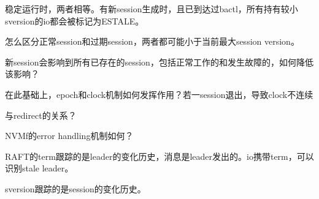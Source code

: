 稳定运行时，两者相等。有新session生成时，且已到达过bactl，所有持有较小sversion的io都会被标记为ESTALE。

怎么区分正常session和过期session，两者都可能小于当前最大session version。

新session会影响到所有已存在的session，包括正常工作的和发生故障的，如何降低该影响？

在此基础上，epoch和clock机制如何发挥作用？若一session退出，导致clock不连续

与redirect的关系？

NVMf的error handling机制如何？

\hrulefill


RAFT的term跟踪的是leader的变化历史，消息是leader发出的。io携带term，可以识别stale leader。

sversion跟踪的是session的变化历史。
